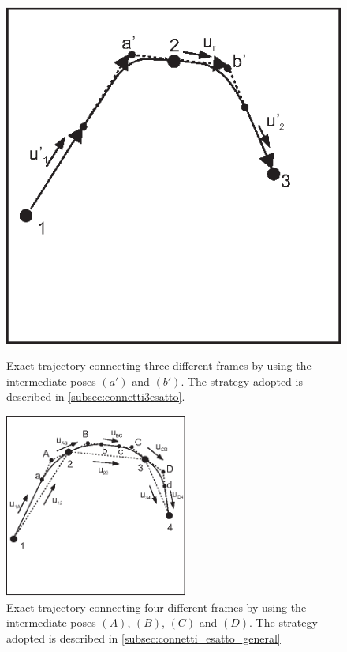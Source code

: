 \begin{figure}[tbp]
    \begin{minipage}[t]{0.49\textwidth}
        \centering
        \includegraphics{figures/connetti3esatto}
        \caption{Exact trajectory connecting three different frames by using the intermediate poses $(a')$ and $(b')$. The strategy adopted is described in \ref{subsec:connetti3esatto}.}
        \label{fig:connetti3esatto}
    \end{minipage}
    \hfill
    \begin{minipage}[t]{0.49\textwidth}
        \centering
        \includegraphics[width=6cm]{figures/connetti4esatto.eps}
        \caption{Exact trajectory connecting four different frames by using the intermediate poses $(A)$, $(B)$, $(C)$ and $(D)$. The strategy adopted is described in \ref{subsec:connetti_esatto_general}}
        \label{fig:legnani_general_method}
    \end{minipage}
\end{figure}

